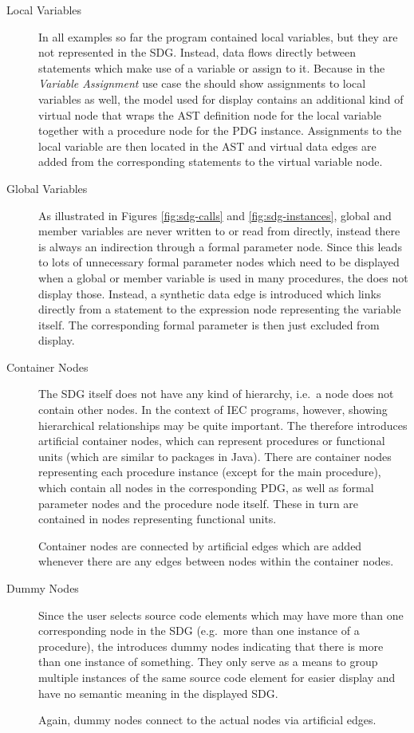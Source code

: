 \begin{description}
  \item[Local Variables] In all examples so far the program contained local variables, but they are not represented in 
  the SDG. Instead, data flows directly between statements which make use of a variable or assign to it. Because in the 
  \emph{Variable Assignment} use case the \SB should show assignments to local variables as well, the model used for 
  display contains an additional kind of virtual node that wraps the AST definition node for the local variable 
  together with a procedure node for the PDG instance. Assignments to the local variable are then located in the AST 
  and virtual data edges are added from the corresponding statements to the virtual variable node.

  \item[Global Variables] As illustrated in Figures \ref{fig:sdg-calls} and \ref{fig:sdg-instances}, global and member 
  variables are never written to or read from directly, instead there is always an indirection through a formal 
  parameter node. Since this leads to lots of unnecessary formal parameter nodes which need to be displayed when a 
  global or member variable is used in many procedures, the \SB does not display those. Instead, a synthetic data edge 
  is introduced which links directly from a statement to the expression node representing the variable itself. The 
  corresponding formal parameter is then just excluded from display.
  
  \item[Container Nodes] The SDG itself does not have any kind of hierarchy, i.e.\ a node does not contain other nodes. 
  In the context of IEC programs, however, showing hierarchical relationships may be quite important. The \SB therefore 
  introduces artificial container nodes, which can represent procedures or functional units (which are similar to 
  packages in Java). There are container nodes representing each procedure instance (except for the main procedure), 
  which contain all nodes in the corresponding PDG, as well as formal parameter nodes and the procedure node itself. 
  These in turn are contained in nodes representing functional units.
  
  Container nodes are connected by artificial edges which are added whenever there are any edges between nodes within 
  the container nodes.
  
  \item[Dummy Nodes] Since the user selects source code elements which may have more than one corresponding node in the 
  SDG (e.g.\ more than one instance of a procedure), the \SB introduces dummy nodes indicating that there is more   
  than one instance of something. They only serve as a means to group multiple instances of the same source code   
  element for easier display and have no semantic meaning in the displayed SDG.
  
  Again, dummy nodes connect to the actual nodes via artificial edges.
\end{description}
